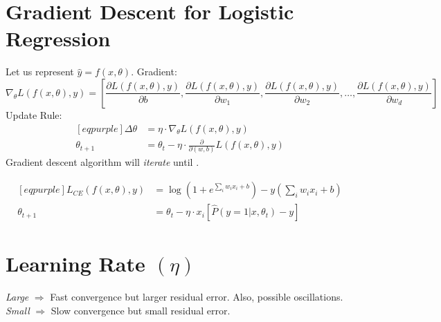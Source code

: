 \documentclass[
	exam={Midterm}
]{cs584exam}
\begin{document}
\section{Gradient Descent for Logistic Regression}\label{sec:gradient-descent-for-logistic-regression}
Let us represent $\hat{y}=f(x, \theta)$.
Gradient:
\begin{equation}[eqpurple]
	\nabla_{\theta} L(f(x,\theta), y) = \left[ \frac{\partial L(f(x, \theta), y)}{\partial b} , \frac{\partial L(f(x, \theta), y)}{\partial w_{1}}, \frac{\partial L(f(x, \theta), y)}{\partial w_{2}}, \dots, \frac{\partial L(f(x, \theta), y)}{\partial w_{d}} \right]
	\label{eq:gradient}
\end{equation}
Update Rule:
\begin{equation}[eqpurple]
	\begin{aligned}[eqpurple]
		\Delta\theta &= \eta\cdot\nabla_{\theta}L(f(x,\theta), y)\\
		\theta_{t+1} &= \theta_{t} - \eta\cdot\frac{\partial}{\partial (w,b)}L(f(x,\theta), y)
	\end{aligned}
	\label{eq:update-rule}
\end{equation}
Gradient descent algorithm will \emph{iterate} until \data{$\Delta\theta < \epsilon$}.

\begin{equation*}
	\begin{aligned}[eqpurple]
		L_{CE}(f(x, \theta), y) &= \log\left( 1 + e^{\sum_{i} w_{i}x_{i} + b} \right) - y\left( \sum_{i}w_{i}x_{i} + b \right)\\
		\theta_{t+1} &= \theta_{t} - \eta\cdot x_{i}\left[ \hat{P}(y = 1|x,\theta_{t}) - y \right]
	\end{aligned}
\end{equation*}

\section{Learning Rate $(\eta)$}\label{sec:learning-rate}
\emph{Large} \data{$\eta$} $\Rightarrow$ Fast convergence but larger residual error.
Also, possible oscillations.
\emph{Small} \data{$\eta$} $\Rightarrow$ Slow convergence but small residual error.
\end{document}
